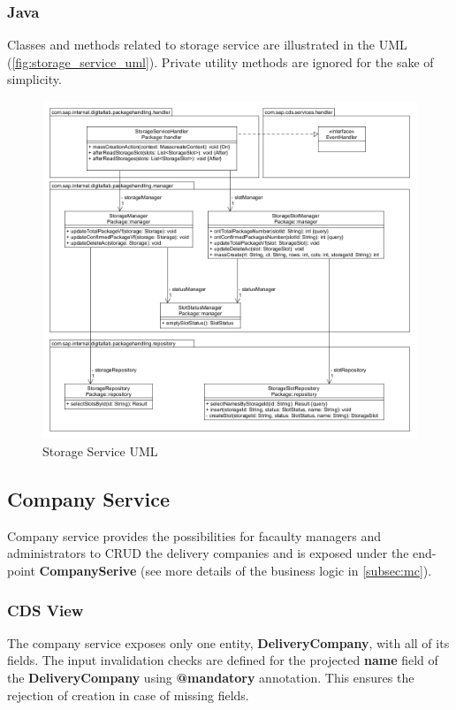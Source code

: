 \subsubsection{Java}

Classes and methods related to storage service are illustrated in the UML (\autoref{fig:storage_service_uml}). Private utility methods are ignored for the sake of simplicity.
\begin{figure}[H]
    \centering
    \includegraphics[width=1\linewidth]{images/service_class_diagrams/storage_service_class_diagram.png}
    \caption{Storage Service UML}
    \label{fig:storage_service_uml}
\end{figure}

\subsection{Company Service}
\label{subsec:back-mc}

Company service provides the possibilities for facaulty managers and administrators to CRUD the delivery companies and is exposed under the end-point \textbf{CompanySerive} (see more details of the business logic in \autoref{subsec:mc}).

\subsubsection{CDS View}
The company service exposes only one entity, \textbf{DeliveryCompany}, with all of its fields.
The input invalidation checks are defined for the projected \textbf{name} field of the \textbf{DeliveryCompany} using \textbf{@mandatory} annotation. This ensures the rejection of creation in case of missing fields. 

